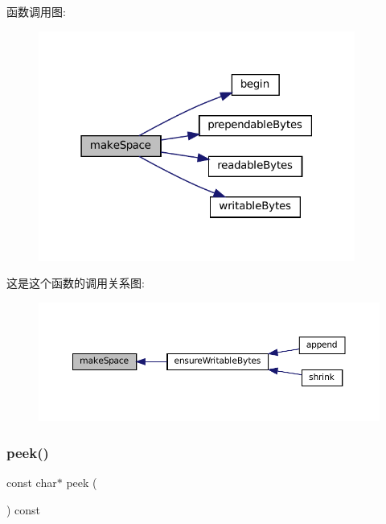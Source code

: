 函数调用图\+:
\nopagebreak
\begin{figure}[H]
\begin{center}
\leavevmode
\includegraphics[width=295pt]{classmuduo_1_1net_1_1Buffer_a83d5a5ce302569b35df7743314578791_cgraph}
\end{center}
\end{figure}
这是这个函数的调用关系图\+:
\nopagebreak
\begin{figure}[H]
\begin{center}
\leavevmode
\includegraphics[width=350pt]{classmuduo_1_1net_1_1Buffer_a83d5a5ce302569b35df7743314578791_icgraph}
\end{center}
\end{figure}
\mbox{\label{classmuduo_1_1net_1_1Buffer_ad1339d8b1a42e9762ae6cd3add003706}} 
\subsubsection{\texorpdfstring{peek()}{peek()}}
{\footnotesize\ttfamily const char$\ast$ peek (\begin{DoxyParamCaption}{ }\end{DoxyParamCaption}) const\hspace{0.3cm}{\ttfamily [inline]}}



